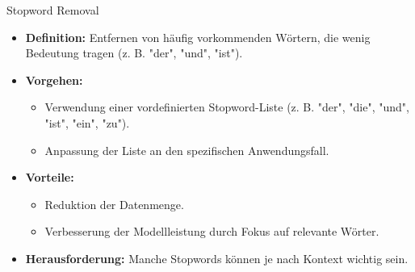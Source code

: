 \documentclass[aspectratio=1610, xcolor=dvipsnames, 9pt]{beamer}
\begin{document}
\begin{frame}{Stopword Removal}
  \begin{itemize}
    \item \textbf{Definition:} Entfernen von häufig vorkommenden Wörtern, die wenig Bedeutung tragen (z. B. "der", "und", "ist").
    \item \textbf{Vorgehen:}
      \begin{itemize}
        \item Verwendung einer vordefinierten Stopword-Liste (z. B. "der", "die", "und", "ist", "ein", "zu").
        \item Anpassung der Liste an den spezifischen Anwendungsfall.
      \end{itemize}
    \item \textbf{Vorteile:}
      \begin{itemize}
        \item Reduktion der Datenmenge.
        \item Verbesserung der Modellleistung durch Fokus auf relevante Wörter.
      \end{itemize}
    \item \textbf{Herausforderung:} Manche Stopwords können je nach Kontext wichtig sein.
  \end{itemize}
\end{frame}

\end{document}
